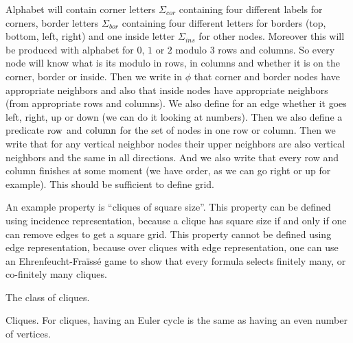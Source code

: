 {
Alphabet will contain corner letters $\Sigma_{cor}$ containing four different labels for corners, border letters $\Sigma_{bor}$
containing four different letters for borders (top, bottom, left, right) and one inside letter $\Sigma_{ins}$ for other nodes.
Moreover this will be produced with alphabet for $0$, $1$ or $2$ modulo $3$ rows and columns. So every node will
know what is its modulo in rows, in columns and whether it is on the corner, border or inside.
Then we write in $\phi$ that corner and border nodes have appropriate neighbors and also that inside nodes have
appropriate neighbors (from appropriate rows and columns). We also define for an edge whether it goes
left, right, up or down (we can do it looking at numbers). Then we also define a predicate $\textup{row}$ and $\textup{column}$
for the set of nodes in one row or column. Then we write that for any vertical neighbor nodes their upper neighbors are also vertical
neighbors and the same in all directions. And we also write that every row and column finishes at some moment (we have order,
as we can go right or up for example). This should be sufficient to define grid.
}

{An example property is ``cliques of square size''. This property can be defined using incidence 
representation, because a clique has square size  if and only if one can remove edges to get a square grid. This property cannot be defined using edge representation, because over cliques with edge representation, one can use 
an Ehrenfeucht-Fra\"iss\'e game to show that every \mso formula selects finitely many, or co-finitely many cliques.
}


{The class of cliques.
}


{
Cliques.  For cliques, having an Euler cycle is the same as having an even number of vertices.
}

